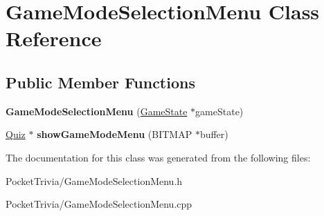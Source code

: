 \hypertarget{class_game_mode_selection_menu}{}\section{Game\+Mode\+Selection\+Menu Class Reference}
\label{class_game_mode_selection_menu}
\subsection*{Public Member Functions}
\begin{DoxyCompactItemize}
\item 
\mbox{\label{class_game_mode_selection_menu_a6bacc0b8af5df2978f82b81014c10ff7}} 
{\bfseries Game\+Mode\+Selection\+Menu} (\mbox{\hyperlink{struct_game_state}{Game\+State}} $\ast$game\+State)
\item 
\mbox{\label{class_game_mode_selection_menu_a88071557e775c2d6ab044e0b68215d40}} 
\mbox{\hyperlink{class_quiz}{Quiz}} $\ast$ {\bfseries show\+Game\+Mode\+Menu} (B\+I\+T\+M\+AP $\ast$buffer)
\end{DoxyCompactItemize}


The documentation for this class was generated from the following files\+:\begin{DoxyCompactItemize}
\item 
Pocket\+Trivia/Game\+Mode\+Selection\+Menu.\+h\item 
Pocket\+Trivia/Game\+Mode\+Selection\+Menu.\+cpp\end{DoxyCompactItemize}

